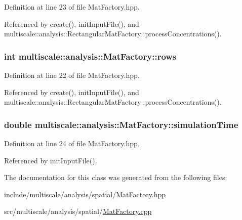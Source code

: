 Definition at line 23 of file Mat\-Factory.\-hpp.



Referenced by create(), init\-Input\-File(), and multiscale\-::analysis\-::\-Rectangular\-Mat\-Factory\-::process\-Concentrations().

\hypertarget{classmultiscale_1_1analysis_1_1MatFactory_a35672fb0c992f662018ee7c146794474}{
\subsubsection[{rows}]{\setlength{\rightskip}{0pt plus 5cm}int multiscale\-::analysis\-::\-Mat\-Factory\-::rows\hspace{0.3cm}{\ttfamily [protected]}}}\label{classmultiscale_1_1analysis_1_1MatFactory_a35672fb0c992f662018ee7c146794474}


Definition at line 22 of file Mat\-Factory.\-hpp.



Referenced by create(), init\-Input\-File(), and multiscale\-::analysis\-::\-Rectangular\-Mat\-Factory\-::process\-Concentrations().

\hypertarget{classmultiscale_1_1analysis_1_1MatFactory_a99caa620805ac50375699236d83fbd96}{
\subsubsection[{simulation\-Time}]{\setlength{\rightskip}{0pt plus 5cm}double multiscale\-::analysis\-::\-Mat\-Factory\-::simulation\-Time\hspace{0.3cm}{\ttfamily [protected]}}}\label{classmultiscale_1_1analysis_1_1MatFactory_a99caa620805ac50375699236d83fbd96}


Definition at line 24 of file Mat\-Factory.\-hpp.



Referenced by init\-Input\-File().



The documentation for this class was generated from the following files\-:\begin{DoxyCompactItemize}
\item 
include/multiscale/analysis/spatial/\hyperlink{MatFactory_8hpp}{Mat\-Factory.\-hpp}\item 
src/multiscale/analysis/spatial/\hyperlink{MatFactory_8cpp}{Mat\-Factory.\-cpp}\end{DoxyCompactItemize}
